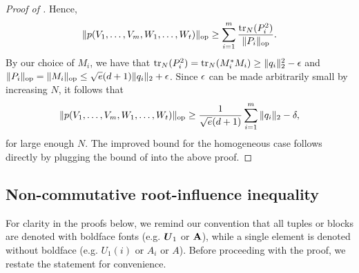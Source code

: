 \begin{proof}[Proof of ]
    Hence,
     \[ \|p(V_1, \ldots, V_m, W_1, \ldots, W_t)\|_{\mathrm{op}} \ge \sum_{i=1}^m \frac{\mathrm{tr}_N(P_i^2)}{\|P_i\|_{\mathrm{op}}}.\]
     By our choice of $M_i$, we have that $\mathrm{tr}_N(P_i^2) = \mathrm{tr}_N(M_i^* M_i) \ge \|q_i\|_2^2 - \epsilon$ and $\|P_i\|_{\mathrm{op}} = \|M_i\|_{\mathrm{op}} \le \sqrt{e}(d+1)\|q_i\|_2 + \epsilon$. Since $\epsilon$ can be made arbitrarily small by increasing $N$, it follows that 
      \[ \|p(V_1, \ldots, V_m, W_1, \ldots, W_t)\|_{\mathrm{op}} \ge \frac1{\sqrt{e}(d+1)} \sum_{i=1}^m \|q_i\|_2 - \delta ,\]
     for large enough $N$. The improved bound for the homogeneous case follows directly by plugging the bound of  into the above proof.
\end{proof}





\subsection{Non-commutative root-influence inequality}
\label{sec:bh-proof}


For clarity in the proofs below, we remind our  convention that all tuples or blocks are denoted with boldface fonts (e.g. $\boldsymbol{U}_1$ or $\mathbf{A}$), while a single element is denoted without boldface (e.g. $U_1(i)$ or $A_i$ or $A$). Before proceeding with the proof, we restate the statement for convenience.

\bh*






